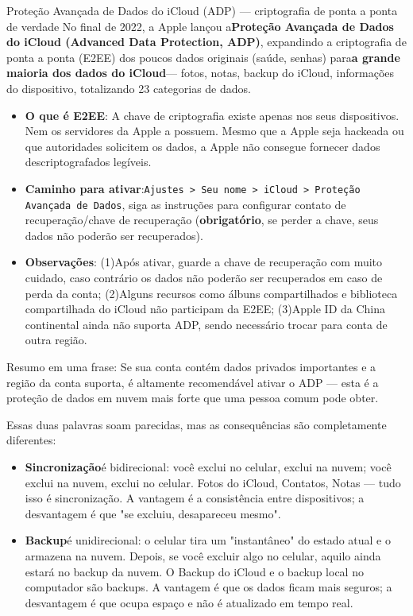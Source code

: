 \begin{tcbwarn}{Proteção Avançada de Dados do iCloud (ADP) — criptografia de ponta a ponta de verdade}
No final de 2022, a Apple lançou a\textbf{Proteção Avançada de Dados do iCloud (Advanced Data Protection, ADP)}, expandindo a criptografia de ponta a ponta (E2EE) dos poucos dados originais (saúde, senhas) para\textbf{a grande maioria dos dados do iCloud}— fotos, notas, backup do iCloud, informações do dispositivo, totalizando 23 categorias de dados.

\begin{itemize}
  \item \textbf{O que é E2EE}: A chave de criptografia existe apenas nos seus dispositivos. Nem os servidores da Apple a possuem. Mesmo que a Apple seja hackeada ou que autoridades solicitem os dados, a Apple não consegue fornecer dados descriptografados legíveis.
  \item \textbf{Caminho para ativar}:\texttt{Ajustes > Seu nome > iCloud > Proteção Avançada de Dados}, siga as instruções para configurar contato de recuperação/chave de recuperação (\textbf{obrigatório}, se perder a chave, seus dados não poderão ser recuperados).
  \item \textbf{Observações}: (1)Após ativar, guarde a chave de recuperação com muito cuidado, caso contrário os dados não poderão ser recuperados em caso de perda da conta; (2)Alguns recursos como álbuns compartilhados e biblioteca compartilhada do iCloud não participam da E2EE; (3)Apple ID da China continental ainda não suporta ADP, sendo necessário trocar para conta de outra região.
\end{itemize}

Resumo em uma frase: Se sua conta contém dados privados importantes e a região da conta suporta, é altamente recomendável ativar o ADP — esta é a proteção de dados em nuvem mais forte que uma pessoa comum pode obter.

\end{tcbwarn}


Essas duas palavras soam parecidas, mas as consequências são completamente diferentes:

\begin{itemize}
  \item \textbf{Sincronização}é bidirecional: você exclui no celular, exclui na nuvem; você exclui na nuvem, exclui no celular. Fotos do iCloud, Contatos, Notas — tudo isso é sincronização. A vantagem é a consistência entre dispositivos; a desvantagem é que "se excluiu, desapareceu mesmo".
  \item \textbf{Backup}é unidirecional: o celular tira um "instantâneo" do estado atual e o armazena na nuvem. Depois, se você excluir algo no celular, aquilo ainda estará no backup da nuvem. O Backup do iCloud e o backup local no computador são backups. A vantagem é que os dados ficam mais seguros; a desvantagem é que ocupa espaço e não é atualizado em tempo real.
\end{itemize}

